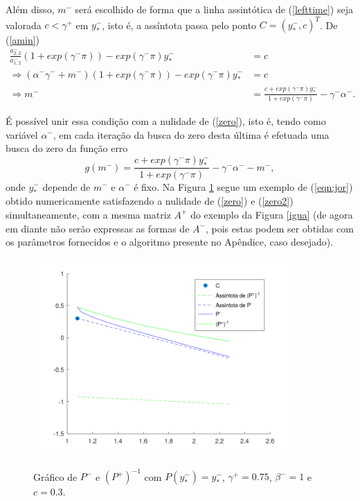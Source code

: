 Além disso, $m^-$ será escolhido de forma que a linha assintótica de (\ref{lefttime}) seja valorada $c<\gamma^+$ em $y^-_*$, isto é, a assíntota passa pelo ponto $C=(y^-_*,c)^T$. De (\ref{amin})
\begin{align*}
\frac{a^-_{2,2}}{a^-_{1,2}}(1+exp(\gamma^-\pi))-exp(\gamma^-\pi)y_*^-&=c \\
\Rightarrow\left(\alpha^-\gamma^-+m^-\right)(1+exp(\gamma^-\pi))-exp(\gamma^-\pi)y_*^-&=c \\
\Rightarrow m^-&=\frac{c+exp(\gamma^-\pi)y_*^-}{1+exp(\gamma^-\pi)}-\gamma^-\alpha^-.
\end{align*}

É possível unir essa condição com a nulidade de (\ref{zero}), isto é, tendo como variável $\alpha^-$, em cada iteração da busca do zero desta última é efetuada uma busca do zero da função erro
\begin{equation}
\label{zero2}
g(m^-)=\frac{c+exp(\gamma^-\pi)y_*^-}{1+exp(\gamma^-\pi)}-\gamma^-\alpha^--m^-,
\end{equation}
onde $y_*^-$ depende de $m^-$ e $\alpha^-$ é fixo. Na Figura \ref{c03} segue um exemplo de (\ref{eqn:jor}) obtido numericamente satisfazendo a nulidade de (\ref{zero}) e (\ref{zero2}) simultaneamente, com a mesma matriz $A^+$ do exemplo da Figura \ref{igua} (de agora em diante não serão expressas as formas de $A^-$, pois estas podem ser obtidas com os parâmetros fornecidos e o algoritmo presente no Apêndice, caso desejado).
\begin{figure}[H]
\centering
\includegraphics[width=10cm]{poinc3}\\
\vspace{\baselineskip}
\caption{\label{c03}Gráfico de $P^-$ e $(P^+)^{-1}$ com $P(y^-_*)=y^-_*$, $\gamma^+=0.75$, $\beta^-=1$ e $c=0.3$.}
\end{figure}

